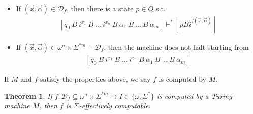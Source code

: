 \documentclass[a4paper, 12pt]{article}
\newtheorem{theorem}{Theorem}
\newtheorem{theorem}{Theorem}
\begin{document}
\begin{itemize}
    \item If $(\vec{x}, \vec{\alpha}) \in \mathcal{D}_f$, then there is a state
        $p \in Q$ s.t. 
        \begin{align*}
            \left\lfloor q_0 ~ B ~ i^{x_1} ~ B ~ \ldots ~ i^{x_n} ~ B ~ \alpha_1
            ~ B ~ \ldots ~ B ~ \alpha_m\right\rfloor \vdash^* \left\lfloor pB
            i^{f(\vec{x}, \vec{\alpha})} \right\rfloor
        \end{align*} 

    \item If $(\vec{x}, \vec{\alpha}) \in \omega^{n} \times \Sigma^{*m} -
        \mathcal{D}_f$, then the machine does not halt starting from  
        \begin{align*}
            \left\lfloor q_0 ~ B ~ i^{x_1} ~ B ~ \ldots ~ i^{x_n} ~ B ~ \alpha_1
            ~ B ~ \ldots ~ B ~ \alpha_m\right\rfloor 
        \end{align*}
\end{itemize}

If $M$ and $f$ satisfy the properties above, we say $f$ is computed by $M$.

\begin{theorem}
    If $f : \mathcal{D}_f \subseteq \omega^{n} \times \Sigma^{*m} \mapsto I \in
    \{\omega, \Sigma^{*}\}$ is computed by a Turing machine $M$, then $f$ is $\Sigma$-effectively
    computable.
\end{theorem}
\end{document}
